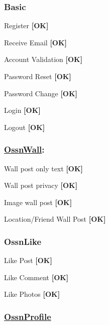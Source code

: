 \subsubsection*{Basic}


\begin{DoxyItemize}
\item Register {\bfseries \mbox{[}OK\mbox{]}}
\item Receive Email {\bfseries \mbox{[}OK\mbox{]}}
\item Account Validation {\bfseries \mbox{[}OK\mbox{]}}
\item Password Reset {\bfseries \mbox{[}OK\mbox{]}}
\item Password Change {\bfseries \mbox{[}OK\mbox{]}}
\item Login {\bfseries \mbox{[}OK\mbox{]}}
\item Logout {\bfseries \mbox{[}OK\mbox{]}}
\end{DoxyItemize}

\subsubsection*{\hyperlink{class_ossn_wall}{Ossn\+Wall}\+:}


\begin{DoxyItemize}
\item Wall post only text {\bfseries \mbox{[}OK\mbox{]}}
\item Wall post privacy {\bfseries \mbox{[}OK\mbox{]}}
\item Image wall post {\bfseries \mbox{[}OK\mbox{]}}
\item Location/\+Friend Wall Post {\bfseries \mbox{[}OK\mbox{]}}
\end{DoxyItemize}

\subsubsection*{Ossn\+Like}


\begin{DoxyItemize}
\item Like Post {\bfseries \mbox{[}OK\mbox{]}}
\item Like Comment {\bfseries \mbox{[}OK\mbox{]}}
\item Like Photos {\bfseries \mbox{[}OK\mbox{]}}
\end{DoxyItemize}

\subsubsection*{\hyperlink{class_ossn_profile}{Ossn\+Profile}}


